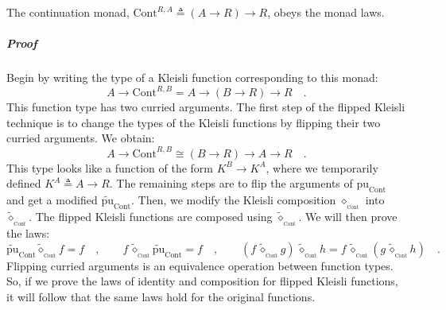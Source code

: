 The continuation monad, $\text{Cont}^{R,A}\triangleq\left(A\rightarrow R\right)\rightarrow R$,
obeys the monad laws.

\subparagraph{Proof}

Begin by writing the type of a Kleisli function corresponding to this
monad:
\[
A\rightarrow\text{Cont}^{R,B}=A\rightarrow\left(B\rightarrow R\right)\rightarrow R\quad.
\]
This function type has two curried arguments. The first step of the
flipped Kleisli technique is to change the types of the Kleisli functions
by flipping their two curried arguments. We obtain:
\[
A\rightarrow\text{Cont}^{R,B}\cong\left(B\rightarrow R\right)\rightarrow A\rightarrow R\quad.
\]
This type looks like a function of the form $K^{B}\rightarrow K^{A}$,
where we temporarily defined $K^{A}\triangleq A\rightarrow R$. The
remaining steps are to flip the arguments of $\text{pu}_{\text{Cont}}$
and get a modified $\tilde{\text{pu}}_{\text{Cont}}$. Then, we modify
the Kleisli composition $\diamond_{_{\text{Cont}}}$ into $\tilde{\diamond}_{_{\text{Cont}}}$.
The flipped Kleisli functions are composed using $\tilde{\diamond}_{_{\text{Cont}}}$.
We will then prove the laws:
\[
\tilde{\text{pu}}_{\text{Cont}}\tilde{\diamond}_{_{\text{Cont}}}f=f\quad,\quad\quad f\,\tilde{\diamond}_{_{\text{Cont}}}\tilde{\text{pu}}_{\text{Cont}}=f\quad,\quad\quad(f\,\tilde{\diamond}_{_{\text{Cont}}}g)\,\tilde{\diamond}_{_{\text{Cont}}}h=f\,\tilde{\diamond}_{_{\text{Cont}}}(g\,\tilde{\diamond}_{_{\text{Cont}}}h)\quad.
\]
Flipping curried arguments is an equivalence operation between function
types. So, if we prove the laws of identity and composition for flipped
Kleisli functions, it will follow that the same laws hold for the
original functions.

